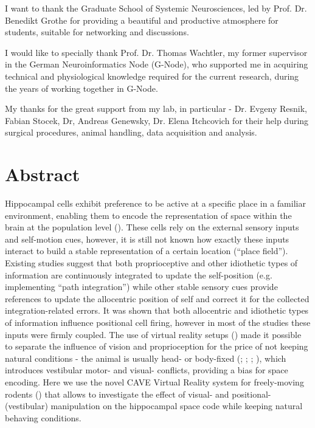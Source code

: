 \documentclass[twoside, 12pt,  footinclude=true,  headinclude=true,  cleardoublepage=empty]{scrbook}
\begin{document}
I want to thank the Graduate School of Systemic Neurosciences, led by Prof. Dr. Benedikt Grothe for providing a beautiful and productive atmosphere for students, suitable for networking and discussions.

I would like to specially thank Prof. Dr. Thomas Wachtler, my former supervisor in the German Neuroinformatics Node (G-Node), who supported me in acquiring technical and physiological knowledge required for the current research, during the years of working together in G-Node.

My thanks for the great support from my lab, in particular - Dr. Evgeny Resnik, Fabian Stocek, Dr, Andreas Genewsky, Dr. Elena Itchcovich for their help during surgical procedures, animal handling, data acquisition and analysis.

\endgroup

\tableofcontents

\listoffigures

\chapter*{Abstract}
Hippocampal cells exhibit preference to be active at a specific place in a familiar environment, enabling them to encode the representation of space within the brain at the population level (\cite{OKEEFE1971171}). These cells rely on the external sensory inputs and self-motion cues, however, it is still not known how exactly these inputs interact to build a stable representation of a certain location (“place field”). Existing studies suggest that both proprioceptive and other idiothetic types of information are continuously integrated to update the self-position (e.g. implementing “path integration”) while other stable sensory cues provide references to update the allocentric position of self and correct it for the collected integration-related errors. It was shown that both allocentric and idiothetic types of information influence positional cell firing, however in most of the studies these inputs were firmly coupled. The use of virtual reality setups (\cite{Thurley2016}) made it possible to separate the influence of vision and proprioception for the price of not keeping natural conditions - the animal is usually head- or body-fixed (\cite{Holscher2005}; \cite{RavassardA.2013}; \cite{Jayakumar2018a}; \cite{Haas2019}), which introduces vestibular motor- and visual- conflicts, providing a bias for space encoding. Here we use the novel CAVE Virtual Reality system for freely-moving rodents (\cite{DelGrosso2018}) that allows to investigate the effect of visual- and positional- (vestibular) manipulation on the hippocampal space code while keeping natural behaving conditions.
\end{document}
